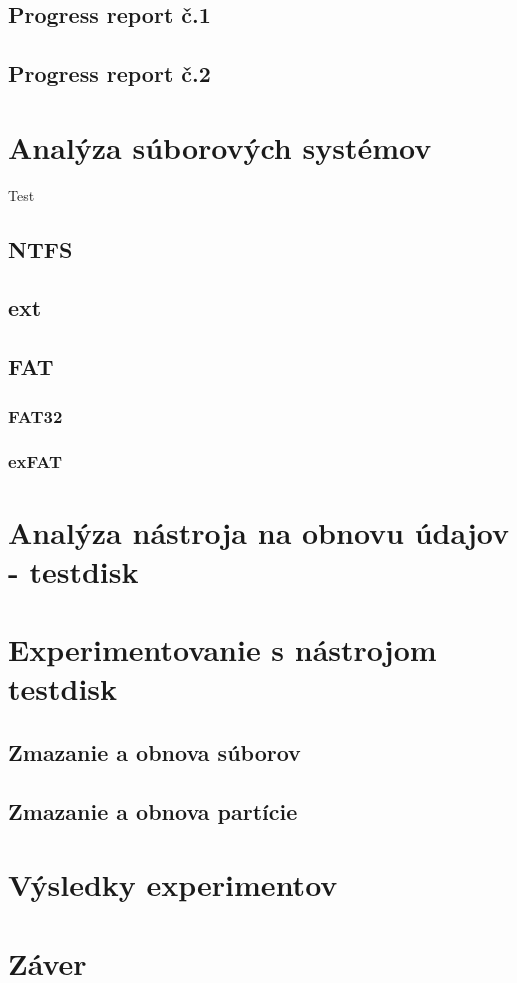 \documentclass[12pt,oneside,slovak,a4paper]{article}
\begin{document}
\subsection{Progress report č.1}

\subsection{Progress report č.2}


\section{Analýza súborových systémov}
Test\cite{TEST}
\subsection{NTFS}
\subsection{ext}
\subsection{FAT}
\subsubsection{FAT32}
\subsubsection{exFAT}


\section{Analýza nástroja na obnovu údajov - testdisk}

\section{Experimentovanie s nástrojom testdisk}
\subsection{Zmazanie a obnova súborov}
\subsection{Zmazanie a obnova partície}

\section{Výsledky experimentov}

\section{Záver}




\end{document}
